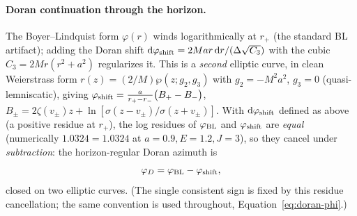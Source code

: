 \documentclass[12pt]{iopart}
\theoremstyle{plain}
\theoremstyle{definition}
\theoremstyle{remark}
\newcommand{\rp}{r_{+}}
\newcommand{\dd}{\mathrm{d}}
\begin{document}
\paragraph{Doran continuation through the horizon.} The Boyer--Lindquist form
$\varphi(r)$ winds logarithmically at $\rp$ (the standard BL artifact); adding the
Doran shift $\dd\varphi_{\rm shift}=2Mar\,\dd r/(\Delta\sqrt{C_3})$ with the cubic
$C_3=2Mr(r^2+a^2)$ regularizes it. This is a \emph{second} elliptic curve, in
clean Weierstrass form $r(z)=(2/M)\wp(z;g_2,g_3)$ with $g_2=-M^2a^2$, $g_3=0$
(quasi-lemniscatic), giving
$\varphi_{\rm shift}=\tfrac{a}{r_+-r_-}\big(B_+-B_-\big)$,
$B_\pm=2\zeta(v_\pm)z+\ln[\sigma(z-v_\pm)/\sigma(z+v_\pm)]$. With
$\dd\varphi_{\rm shift}$ defined as above (a positive residue at $\rp$), the
log residues of $\varphi_{\rm BL}$ and $\varphi_{\rm shift}$ are \emph{equal}
(numerically $1.0324=1.0324$ at $a=0.9,E=1.2,J=3$), so they cancel under
\emph{subtraction}: the horizon-regular Doran azimuth is
\begin{equation}
    \varphi_D=\varphi_{\rm BL}-\varphi_{\rm shift},
    \label{eq:doran-phi}
\end{equation}
closed on two elliptic curves. (The single consistent sign is fixed by this
residue cancellation; the same convention is used throughout,
Equation~\eqref{eq:doran-phi}.)
\end{document}
